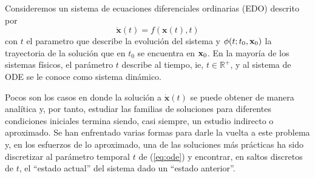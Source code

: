 Consideremos un sistema de ecuaciones diferenciales ordinarias (EDO) descrito por 
\begin{equation}
\dot{\mathbf{x}}(t) = f(\mathbf{x}(t),t)
\label{eq:ode}
\end{equation}
con $t$ el parametro que describe la evolución del sistema y $\phi(t;t_0,\mathbf{x}_0)$ la trayectoria de la solución que en $t_0$ se encuentra en $\mathbf{x}_0$. En la mayoría de los sistemas físicos, el parámetro $t$ describe al tiempo, ie, $t \in \mathbb{R}^+$, y al sistema de ODE se le conoce como sistema dinámico.

Pocos son los casos en donde la solución a $\dot{\mathbf{x}}(t)$ se puede obtener de manera analítica y, por tanto, estudiar las familias de soluciones para diferentes condiciones iniciales termina siendo, casi siempre, un estudio indirecto o aproximado. Se han enfrentado varias formas para darle la vuelta a este problema y, en los esfuerzos de lo aproximado, una de las soluciones más prácticas ha sido discretizar al parámetro temporal $t$ de (\ref{eq:ode}) y encontrar, en saltos discretos de $t$, el ``estado actual'' del sistema dado un ``estado anterior''.

